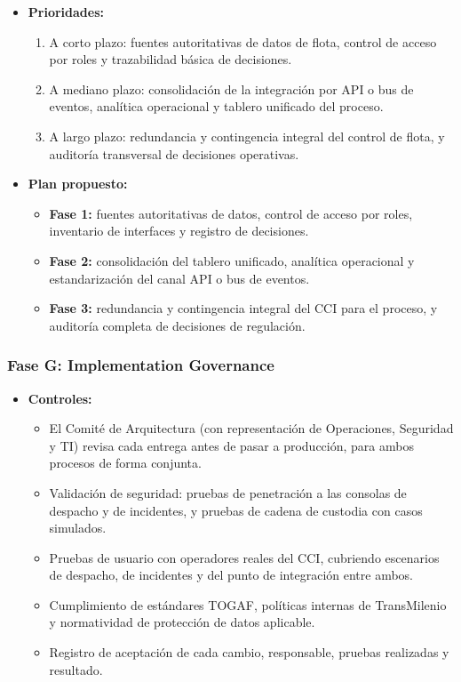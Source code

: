 \begin{singlespace}
\begin{itemize}
	\item \textbf{Prioridades:}
	\begin{enumerate}
		\item A corto plazo: fuentes autoritativas de datos de flota, control de acceso por roles y trazabilidad básica de decisiones.
		\item A mediano plazo: consolidación de la integración por API o bus de eventos, analítica operacional y tablero unificado del proceso.
		\item A largo plazo: redundancia y contingencia integral del control de flota, y auditoría transversal de decisiones operativas.
	\end{enumerate}
	\item \textbf{Plan propuesto:}
	\begin{itemize}
		\item[$\Rightarrow$] \textbf{Fase 1:} fuentes autoritativas de datos, control de acceso por roles, inventario de interfaces y registro de decisiones.
		\item[$\Rightarrow$] \textbf{Fase 2:} consolidación del tablero unificado, analítica operacional y estandarización del canal API o bus de eventos.
		\item[$\Rightarrow$] \textbf{Fase 3:} redundancia y contingencia integral del CCI para el proceso, y auditoría completa de decisiones de regulación.
	\end{itemize}
\end{itemize}

\subsubsection*{Fase G: Implementation Governance}

\begin{itemize}
	\item \textbf{Controles:}
	\begin{itemize}
		\item[$\Rightarrow$] El Comité de Arquitectura (con representación de Operaciones, Seguridad y TI) revisa cada entrega antes de pasar a producción, para ambos procesos de forma conjunta.
		\item[$\Rightarrow$] Validación de seguridad: pruebas de penetración a las consolas de despacho y de incidentes, y pruebas de cadena de custodia con casos simulados.
		\item[$\Rightarrow$] Pruebas de usuario con operadores reales del CCI, cubriendo escenarios de despacho, de incidentes y del punto de integración entre ambos.
		\item[$\Rightarrow$] Cumplimiento de estándares TOGAF, políticas internas de TransMilenio y normatividad de protección de datos aplicable.
		\item[$\Rightarrow$] Registro de aceptación de cada cambio, responsable, pruebas realizadas y resultado.
	\end{itemize}
\end{itemize}


\end{singlespace}
